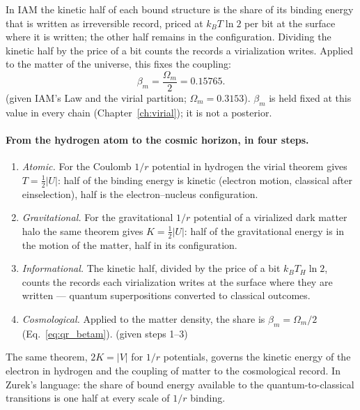 In IAM the kinetic half of each bound structure is the share of its binding energy that is written as irreversible record, priced at $k_BT\ln2$ per bit
at the surface where it is written; the other half remains in the configuration. Dividing the kinetic half by the price of a bit counts the records a
virialization writes. Applied to the matter of the universe, this fixes the coupling:
\begin{equation}
\beta_m=\frac{\Omega_m}{2}=0.15765 .\label{eq:qr_betam}
\end{equation}
\derived{} (given IAM's Law and the virial partition; $\Omega_m=0.3153$). $\beta_m$ is held fixed at this value in every chain (Chapter~\ref{ch:virial});
it is not a posterior.

\paragraph{From the hydrogen atom to the cosmic horizon, in four steps.}
\begin{enumerate}
\item \emph{Atomic.} For the Coulomb $1/r$ potential in hydrogen the virial theorem gives $T=\tfrac12|U|$: half of the binding energy is kinetic
(electron motion, classical after einselection), half is the electron--nucleus configuration. \derived
\item \emph{Gravitational.} For the gravitational $1/r$ potential of a virialized dark matter halo the same theorem gives $K=\tfrac12|U|$: half of the
gravitational energy is in the motion of the matter, half in its configuration. \derived
\item \emph{Informational.} The kinetic half, divided by the price of a bit $k_BT_H\ln2$, counts the records each virialization writes at the surface
where they are written --- quantum superpositions converted to classical outcomes. \interp
\item \emph{Cosmological.} Applied to the matter density, the share is $\beta_m=\Omega_m/2$ (Eq.~\ref{eq:qr_betam}). \derived{} (given steps 1--3)
\end{enumerate}
The same theorem, $2K=|V|$ for $1/r$ potentials, governs the kinetic energy of the electron in hydrogen and the coupling of matter to the cosmological
record. In Zurek's language: the share of bound energy available to the quantum-to-classical transitions is one half at every scale of $1/r$ binding.
\interp

